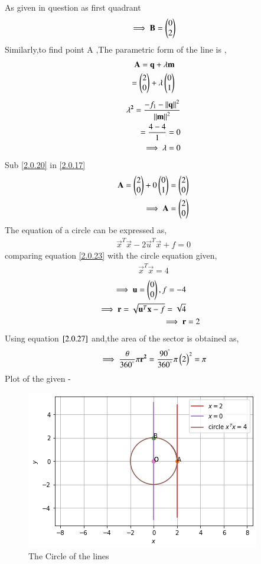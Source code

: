 \documentclass[journal,12pt,twocolumn]{IEEEtran}
\begin{document}
As given in question as first quadrant
\begin{align}
\implies \mathbf{B}=\begin{pmatrix}0\\2\end{pmatrix}   
\end{align}
Similarly,to find point A ,The parametric form of the line is ,
\begin{align}
 \mathbf{A}=\mathbf{q}+\lambda \mathbf{m}\\ =\begin{pmatrix}2\\0\end{pmatrix}+\lambda \begin{pmatrix}0\\1\end{pmatrix} \label{2.0.17}
\end{align}
\begin{align}
 \mathbf{\lambda^2}=\frac{{{-f_1}-\left\lVert\mathbf{q}\right\rVert^2}}{{\left\lVert\mathbf{m}\right\rVert^2}}\\=\frac{{{4}-{4}}}{{{1}}}=0
 \\
\implies \lambda=0 \label{2.0.20}
\end{align}
Sub \eqref{2.0.20} in \eqref{2.0.17}
\begin{align}
 \mathbf{A}=\begin{pmatrix}2 \\0\end{pmatrix}+0\begin{pmatrix}0\\1\end{pmatrix}=\begin{pmatrix}2\\0\end{pmatrix}
 \\
 \implies \mathbf{A}=\begin{pmatrix}2 \\ 0\end{pmatrix}
\end{align}
The equation of a circle can be expressed as,
\begin{align}
\vec{x}^T\vec{x} - 2\vec{u}^T\vec{x} + f= 0\label{2.0.23}
\end{align}
comparing equation \eqref{2.0.23} with the circle equation given,
\begin{align}
\vec{x}^T\vec{x} = 4
\end{align}
\begin{align}
\implies \mathbf{u}=\begin{pmatrix}0\\0\end{pmatrix},f = -4
\\
\implies \mathbf{r}=\sqrt{\mathbf{u}^T\mathbf{x}-{f}}=\sqrt{{4}}
\\
\implies \mathbf{r} &=2 \label{2.0.27}
\end{align}
Using equation $\eqref{2.0.27}$ and,the area of the sector is obtained as,
\begin{align}
 \implies  \frac{\theta}{360^{\degree}}\pi\mathbf{r^2}=\frac{90^{\degree}}{360^{\degree}}\pi\begin{pmatrix}2\end{pmatrix}^2=\pi
\end{align}
Plot of the given -
\begin{figure}[!ht]
\centering
\includegraphics[width=\columnwidth]{Figure 5.png}
\caption{The Circle of the lines }
\label{fig:The circle of the lines}	\end{figure}
\end{document}
